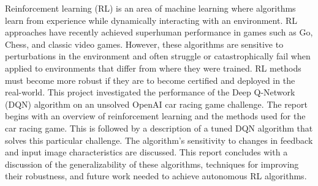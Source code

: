 \thispagestyle{empty}


Reinforcement learning (RL) is an area of machine learning where algorithms learn from experience while dynamically interacting with an environment. RL approaches have recently achieved superhuman performance in games such as Go, Chess, and classic video games. However, these algorithms are sensitive to perturbations in the environment and often struggle or catastrophically fail when applied to environments that differ from where they were trained. RL methods must become more robust if they are to become certified and deployed in the real-world. This project investigated the performance of the Deep Q-Network (DQN) algorithm on an unsolved OpenAI car racing game challenge. The report begins with an overview of reinforcement learning and the methods used for the car racing game. This is followed by a description of a tuned DQN algorithm that solves this particular challenge. The algorithm’s sensitivity to changes in feedback and input image characteristics are discussed. This report concludes with a discussion of the generalizability of these algorithms, techniques for improving their robustness, and future work needed to achieve autonomous RL algorithms. 